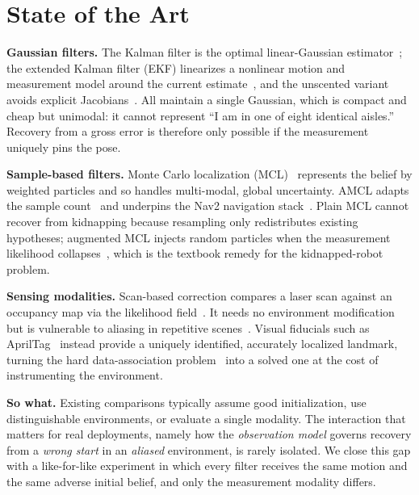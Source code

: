 \documentclass[conference]{IEEEtran}
\begin{document}
\section{State of the Art}

\textbf{Gaussian filters.} The Kalman filter is the optimal linear-Gaussian estimator~\cite{Kalman1960}; the extended Kalman filter (EKF) linearizes a nonlinear motion and measurement model around the current estimate~\cite{Thrun2005}, and the unscented variant avoids explicit Jacobians~\cite{Julier2004}. All maintain a single Gaussian, which is compact and cheap but unimodal: it cannot represent ``I am in one of eight identical aisles.'' Recovery from a gross error is therefore only possible if the measurement uniquely pins the pose.

\textbf{Sample-based filters.} Monte Carlo localization (MCL)~\cite{Dellaert1999} represents the belief by weighted particles and so handles multi-modal, global uncertainty. AMCL adapts the sample count~\cite{Fox2003} and underpins the Nav2 navigation stack~\cite{Macenski2023Nav2}. Plain MCL cannot recover from kidnapping because resampling only redistributes existing hypotheses; augmented MCL injects random particles when the measurement likelihood collapses~\cite{Thrun2005}, which is the textbook remedy for the kidnapped-robot problem.

\textbf{Sensing modalities.} Scan-based correction compares a laser scan against an occupancy map via the likelihood field~\cite{Thrun2005}. It needs no environment modification but is vulnerable to aliasing in repetitive scenes~\cite{Cummins2008,Lowry2016}. Visual fiducials such as AprilTag~\cite{Olson2011,Wang2016} instead provide a uniquely identified, accurately localized landmark, turning the hard data-association problem~\cite{Neira2001} into a solved one at the cost of instrumenting the environment.

\textbf{So what.} Existing comparisons typically assume good initialization, use distinguishable environments, or evaluate a single modality. The interaction that matters for real deployments, namely how the \emph{observation model} governs recovery from a \emph{wrong start} in an \emph{aliased} environment, is rarely isolated. We close this gap with a like-for-like experiment in which every filter receives the same motion and the same adverse initial belief, and only the measurement modality differs.

\end{document}
